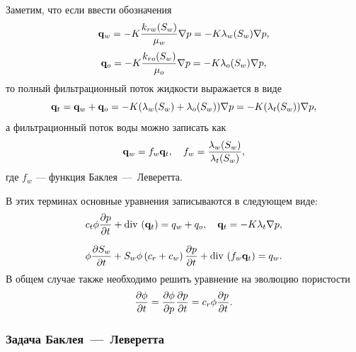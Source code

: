 Заметим, что если ввести обозначения
\begin{equation}
    \mathbf{q}_w = -K\frac{k_{rw}(S_w)}{\mu_w}\nabla p = -K \lambda_w(S_w) \nabla p,
\end{equation}
\begin{equation}
	\mathbf{q}_o = -K\frac{k_{ro}(S_w)}{\mu_o}\nabla p = -K \lambda_o(S_w) \nabla p,
\end{equation}
то полный фильтрационный поток жидкости выражается в виде
\begin{equation}
    \mathbf{q}_t = \mathbf{q}_w + \mathbf{q}_o = -K (\lambda_w(S_w) + \lambda_o(S_w)) \nabla p = -K (\lambda_t(S_w)) \nabla p,
\end{equation}
а фильтрационный поток воды можно записать как 
\begin{equation}
    \mathbf{q}_w = f_w \mathbf{q}_t, \quad f_w  = \dfrac{\lambda_w(S_w)}{\lambda_t(S_w)},
\end{equation}
где $f_w$ --- функция Баклея~---~Леверетта.

В этих терминах основные уравнения записываются в следующем виде:
\begin{equation}\label{eq:diffusion}
    c_t\phi \dfrac{\partial p}{\partial t}
    + \operatorname{div}\, \left( \mathbf{q}_t \right) = q_w + q_o, \quad \mathbf{q}_t = - K \lambda_t \nabla p,
\end{equation}



\begin{equation}\label{eq:satur}
	\phi \dfrac{\partial S_w}{\partial t} + S_w\phi\left(c_r + c_w \right)\dfrac{\partial p}{\partial t} + \operatorname{div}\, \left( f_w \mathbf{q}_t \right) = 
	q_w.
\end{equation}
В общем случае также необходимо решить уравнение на эволюцию пористости
\begin{equation}\label{eq:porosity_evolution}
	\dfrac{\partial \phi}{\partial t} = \dfrac{\partial \phi}{\partial p} \dfrac{\partial p}{\partial t}  = c_r \phi \dfrac{\partial p}{\partial t}.
\end{equation}

\subsubsection{Задача Баклея~---~Леверетта}


